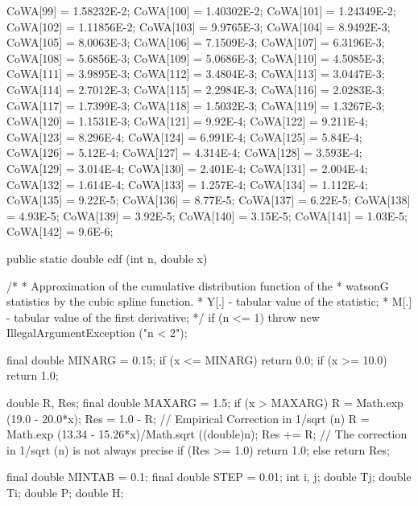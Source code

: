 \begin{code}
\begin{hide}
{      CoWA[99] = 1.58232E-2;
      CoWA[100] = 1.40302E-2;
      CoWA[101] = 1.24349E-2;
      CoWA[102] = 1.11856E-2;
      CoWA[103] = 9.9765E-3;
      CoWA[104] = 8.9492E-3;
      CoWA[105] = 8.0063E-3;
      CoWA[106] = 7.1509E-3;
      CoWA[107] = 6.3196E-3;
      CoWA[108] = 5.6856E-3;
      CoWA[109] = 5.0686E-3;
      CoWA[110] = 4.5085E-3;
      CoWA[111] = 3.9895E-3;
      CoWA[112] = 3.4804E-3;
      CoWA[113] = 3.0447E-3;
      CoWA[114] = 2.7012E-3;
      CoWA[115] = 2.2984E-3;
      CoWA[116] = 2.0283E-3;
      CoWA[117] = 1.7399E-3;
      CoWA[118] = 1.5032E-3;
      CoWA[119] = 1.3267E-3;
      CoWA[120] = 1.1531E-3;
      CoWA[121] = 9.92E-4;
      CoWA[122] = 9.211E-4;
      CoWA[123] = 8.296E-4;
      CoWA[124] = 6.991E-4;
      CoWA[125] = 5.84E-4;
      CoWA[126] = 5.12E-4;
      CoWA[127] = 4.314E-4;
      CoWA[128] = 3.593E-4;
      CoWA[129] = 3.014E-4;
      CoWA[130] = 2.401E-4;
      CoWA[131] = 2.004E-4;
      CoWA[132] = 1.614E-4;
      CoWA[133] = 1.257E-4;
      CoWA[134] = 1.112E-4;
      CoWA[135] = 9.22E-5;
      CoWA[136] = 8.77E-5;
      CoWA[137] = 6.22E-5;
      CoWA[138] = 4.93E-5;
      CoWA[139] = 3.92E-5;
      CoWA[140] = 3.15E-5;
      CoWA[141] = 1.03E-5;
      CoWA[142] = 9.6E-6;
   }\end{hide}

   public static double cdf (int n, double x)\begin{hide} {
     /*
      * Approximation of the cumulative distribution function of the
      * watsonG statistics by the cubic spline function.
      *   Y[.]  - tabular value of the statistic;
      *   M[.]  - tabular value of the first derivative;
      */
      if (n <= 1)
        throw new IllegalArgumentException ("n < 2");

      final double MINARG = 0.15;
      if (x <= MINARG)
         return 0.0;
      if (x >= 10.0)
         return 1.0;

      double R, Res;
      final double MAXARG = 1.5;
      if (x > MAXARG) {
         R = Math.exp (19.0 - 20.0*x);
         Res = 1.0 - R;
         // Empirical Correction in 1/sqrt (n)
         R = Math.exp (13.34 - 15.26*x)/Math.sqrt ((double)n);
         Res += R;
         // The correction in 1/sqrt (n) is not always precise
         if (Res >= 1.0)
            return 1.0;
         else
            return Res;
      }

      final double MINTAB = 0.1;
      final double STEP = 0.01;
      int i, j;
      double Tj;
      double Ti;
      double P;
      double H;

}
\end{hide}
\end{code}
